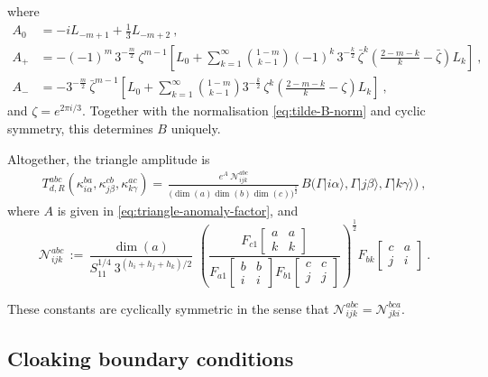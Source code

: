 \documentclass[11pt,a4paper]{article}
\numberwithin{equation}{section}
\begin{document}
%
where
%
\begin{align}
A_0 &= -i L_{-m+1} + \tfrac13 L_{-m+2}~,
\nonumber \\
A_+ &= -(-1)^m \, 3^{-\frac{m}2} \, \zeta^{m-1} \left[
L_0 + 
\sum_{k=1}^\infty \binom{1-m}{k-1} (-1)^k \, 3^{-\frac{k}2} \, \bar\zeta^k \left( \frac{2-m-k}k - \bar\zeta \right) L_k \right]~,
\nonumber \\
A_- &= - 3^{-\frac{m}2} \, \bar\zeta^{m-1} \left[
L_0 + 
\sum_{k=1}^\infty \binom{1-m}{k-1}  3^{-\frac{k}2} \, \zeta^k \left( \frac{2-m-k}k - \zeta \right) L_k \right]~,
\end{align}
and $\zeta = e^{2\pi i/3}$.
Together with the normalisation \eqref{eq:tilde-B-norm} and cyclic symmetry, this determines $B$ uniquely.

\smallskip
Altogether, the triangle amplitude is
%
\begin{align}\label{eq:triangle-amplitude-with-anomaly_computed}
    T_{d,R}^{abc}(\kappa_{i\alpha}^{ba},\kappa_{j\beta}^{cb},\kappa_{k\gamma}^{ac})    
    =\, \frac{e^A\ \mathcal{N}_{ijk}^{abc} }{  
    \big( \dim(a)\dim(b)\dim(c) \big)^{\frac12} }
    \,
    B\big( \Gamma |i\alpha\rangle, \Gamma |j\beta\rangle, \Gamma  |k\gamma\rangle \big)\ ,
\end{align}
%
where $A$ is given in \eqref{eq:triangle-anomaly-factor}, and 
%
\begin{equation}\label{eq:Nijkabc-expression}
    \mathcal{N}_{ijk}^{abc} 
    \,:=\,
    \frac{\dim(a)}{S_{11}^{1/4} \  3^{(h_i+h_j+h_k)/2}} \, \,
\left(\frac{ F_{c1}\!\begin{bmatrix}a & a \\k & k\end{bmatrix} }{
 F_{a1}\!\begin{bmatrix}b & b \\i & i\end{bmatrix}
    F_{b1}\!\begin{bmatrix}c & c \\j & j\end{bmatrix}
    }
    \right)^{\!\!\frac{1}{2}}
F_{bk}\!\begin{bmatrix}c & a \\j & i\end{bmatrix}
\ .
\end{equation}

\noindent
These constants are cyclically symmetric in the sense that $\mathcal{N}_{ijk}^{abc}=\mathcal{N}_{jki}^{bca}$.


\subsection{Cloaking boundary conditions}\label{sec:cloaking-bcs}
\end{document}
